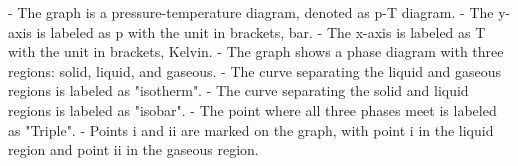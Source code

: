 - The graph is a pressure-temperature diagram, denoted as p-T diagram.
- The y-axis is labeled as p with the unit in brackets, bar.
- The x-axis is labeled as T with the unit in brackets, Kelvin.
- The graph shows a phase diagram with three regions: solid, liquid, and gaseous.
- The curve separating the liquid and gaseous regions is labeled as "isotherm".
- The curve separating the solid and liquid regions is labeled as "isobar".
- The point where all three phases meet is labeled as "Triple".
- Points i and ii are marked on the graph, with point i in the liquid region and point ii in the gaseous region.